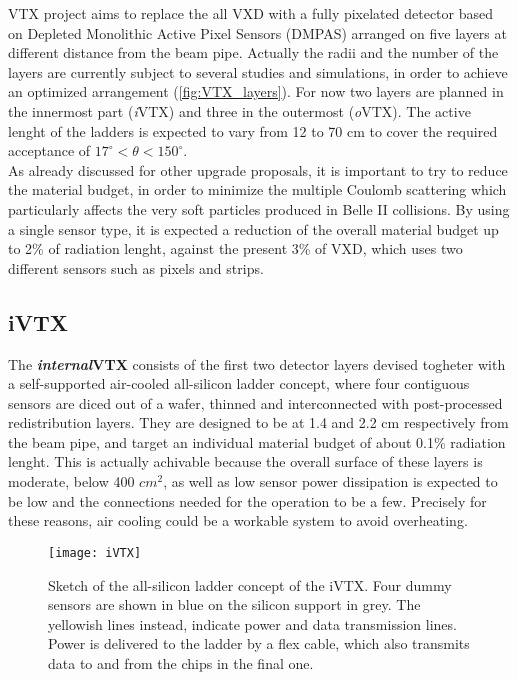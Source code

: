 VTX project aims to replace the all VXD with a fully pixelated detector based on Depleted Monolithic Active Pixel Sensors (DMPAS) arranged on five layers at different distance from the beam pipe. Actually the radii and the number of the layers are currently subject to several  studies and simulations, in order to achieve an optimized arrangement (\autoref{fig:VTX_layers}). 
For now two layers are planned in the innermost part (\textit{i}VTX) and three in the outermost (\textit{o}VTX). The active lenght of the ladders is expected to vary from 12 to 70 cm to cover the required acceptance of $17^{\circ} < \theta < 150^{\circ}$.\\
As already discussed for other upgrade proposals, it is important to try to reduce the material budget, in order to minimize the multiple Coulomb scattering which particularly affects the very soft particles produced in Belle II collisions. By using a single sensor type, it is expected a reduction of the overall material budget up to 2\% of radiation lenght, against the present 3\% of VXD, which uses two different sensors such as pixels and strips.


\subsection{iVTX}

The \textbf{\textit{internal}VTX} consists of the first two detector layers devised togheter with a self-supported air-cooled all-silicon ladder concept, where four contiguous sensors are diced out of a wafer, thinned and interconnected with post-processed redistribution layers. They are designed to be at 1.4 and 2.2 cm respectively from the beam pipe, and target an individual material budget of about 0.1\% radiation lenght. 
This is actually achivable because the overall surface of these layers is moderate, below 400 $cm^{2}$, as well as low sensor power dissipation is expected to be low and the connections needed for the operation to be a few. Precisely for these reasons, air cooling could be a workable system to avoid overheating.


\begin{figure}[h!]
\centering
\texttt{[image: iVTX]}
\caption{Sketch of the all-silicon ladder concept of the iVTX. Four dummy sensors are shown in blue on the silicon support in grey. The yellowish lines instead, indicate power and data transmission lines. Power is delivered to the ladder by a flex cable, which also transmits data to and from the chips in the final one.}
\label{fig:iVTX}
\end{figure}

